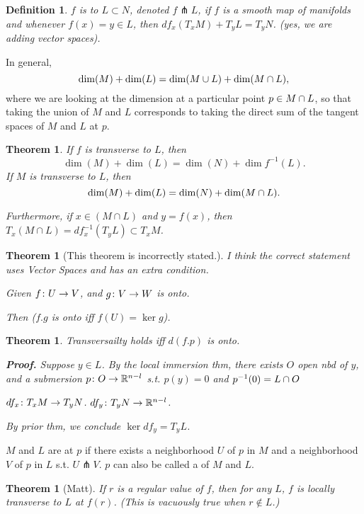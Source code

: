 \documentclass[11pt]{amsbook}
\theoremstyle{mystyle} %
\newtheorem{thrm}[thm]{Theorem}
\newtheorem{defi}[thm]{Definition}
\numberwithin{thm}{section}
\newcommand{\transverse}{\pitchfork}
\begin{document}
\begin{defi}
	$f$ is  to $L \subset N$, denoted $f \transverse L$, if $f$ is a smooth map of manifolds and whenever $f(x) = y \in L$, then $df_x(T_xM) + T_yL = T_yN$.  (yes, we are adding vector spaces).
\end{defi}
\begin{prop}
	In general, $$\dim(M) + \dim(L) = \dim(M \cup L) + \dim(M \cap L),$$ where we are looking at the dimension at a particular point $p \in M \cap L$, so that taking the union of $M$ and $L$ corresponds to taking the direct sum of the tangent spaces of $M$ and $L$ at $p$.
\end{prop}
\begin{thrm}
	If $f$ is transverse to $L$, then $$\dim(M) + \dim(L) = \dim(N) + \dim f^{-1}(L).$$
	If $M$ is transverse to $L$, then $$\dim(M) + \dim(L) = \dim(N) + \dim(M \cap L).$$

	Furthermore, if $x \in (M \cap L)$ and $y = f(x)$, then $T_x (M \cap L) = df^{-1}_x(T_y L) \subset T_x M$.
\end{thrm}
\begin{thrm}[This theorem is incorrectly stated.]
	I think the correct statement uses Vector Spaces and has an extra condition.

	Given $f \colon U \to V$, and
	$g \colon V \to W$ is onto.

	Then ($f.g$ is onto iff $f(U) = \ker g$).
\end{thrm}

\begin{thrm}
	Transversailty holds iff $d(f.p)$ is onto.

	\textbf{Proof.}
	Suppose $y \in L$.
	By the local immersion thm,
	there exists $O$ open nbd of $y$, and a submersion $p \colon O \to {\mathbb R}^{n-l}$
	s.t. $p(y) = 0$ and $p^{-1}(0) = L \cap O$

	$df_x \colon T_xM \to T_yN$.
	$df_y \colon T_yN \to {\mathbb R}^{n-l}$.

	By prior thm, we conclude $\ker df_y = T_yL$.
\end{thrm}

\begin{defn}[Matt]
	$M$ and $L$ are  at $p$ if there exists a neighborhood $U$ of $p$ in $M$ and a neighborhood $V$ of $p$ in $L$ s.t. $U \transverse V$.  $p$ can also be called a  of $M$ and $L$.
\end{defn}

\begin{thrm}[Matt]
	If $r$ is a regular value of $f$, then for any $L$, $f$ is locally transverse to $L$ at $f(r)$.  (This is vacuously true when $r \not\in L$.)
\end{thrm}
\end{document}
